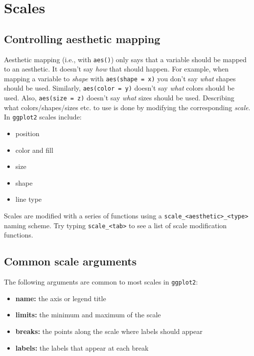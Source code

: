 \documentclass[
]{book}
\providecommand{\tightlist}{%
  \setlength{\itemsep}{0pt}\setlength{\parskip}{0pt}}
\begin{document}
\hypertarget{scales}{%
\section{Scales}\label{scales}}

\hypertarget{controlling-aesthetic-mapping}{%
\subsection{Controlling aesthetic mapping}\label{controlling-aesthetic-mapping}}

Aesthetic mapping (i.e., with \texttt{aes()}) only says that a variable should be mapped to an aesthetic. It doesn't say \emph{how} that should happen. For example, when mapping a variable to \emph{shape} with \texttt{aes(shape\ =\ x)} you don't say \emph{what} shapes should be used. Similarly, \texttt{aes(color\ =\ y)} doesn't say \emph{what} colors should be used. Also, \texttt{aes(size\ =\ z)} doesn't say \emph{what} sizes should be used. Describing what colors/shapes/sizes etc. to use is done by modifying the corresponding \emph{scale}. In \texttt{ggplot2} scales include:

\begin{itemize}
\tightlist
\item
  position
\item
  color and fill
\item
  size
\item
  shape
\item
  line type
\end{itemize}

Scales are modified with a series of functions using a \texttt{scale\_\textless{}aesthetic\textgreater{}\_\textless{}type\textgreater{}} naming scheme. Try typing \texttt{scale\_\textless{}tab\textgreater{}} to see a list of scale modification functions.

\hypertarget{common-scale-arguments}{%
\subsection{Common scale arguments}\label{common-scale-arguments}}

The following arguments are common to most scales in \texttt{ggplot2}:

\begin{itemize}
\tightlist
\item
  \textbf{name:} the axis or legend title
\item
  \textbf{limits:} the minimum and maximum of the scale
\item
  \textbf{breaks:} the points along the scale where labels should appear
\item
  \textbf{labels:} the labels that appear at each break
\end{itemize}
\end{document}
